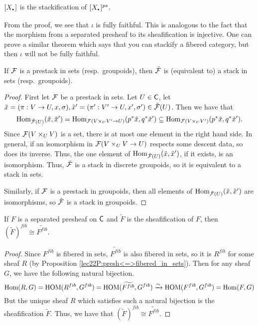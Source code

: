  \begin{definition}
   $[X_\udot]$ is the stackification of $[X_\udot]^{ps}$.
 \end{definition}
 \begin{remark}
   From the proof, we see that $\iota$ is fully faithful. This is analogous to the fact
   that the morphism from a separated presheaf to its sheafification is injective. One
   can prove a similar theorem which says that you can stackify a fibered category, but
   then $\iota$ will not be fully faithful. 
 \end{remark}
 \begin{lemma}
   If $\mathcal{F}$ is a prestack in sets (resp.~groupoids), then $\tilde {\mathcal{F}}$ is (equivalent to) a
   stack in sets (resp.~groupoids).
 \end{lemma}
 \begin{proof}
   First let $\mathcal{F}$ be a prestack in sets. Let $U\in \text{\sf C}$, let $\tilde x=(\pi:V\to
   U,x,\sigma),\tilde x'=(\pi':V'\to U,x',\sigma')\in \tilde{\mathcal{F}}(U)$. Then we have that
   \[
     \operatorname{Hom}_{\tilde {\mathcal{F}}(U)}(\tilde x,\tilde x') = \operatorname{Hom}_{\mathcal{F}(V\times_U V'\to U)}( p^*\tilde
     x,q^*\tilde x')\subseteq \operatorname{Hom}_{\mathcal{F}(V\times_U V')}( p^*\tilde x,q^*\tilde x').
   \]
   Since $\mathcal{F}(V\times_U V)$ is a set, there is at most one element in the right hand side.
   In general, if an isomorphism in $\mathcal{F}(V\times_U V\to U)$ respects some descent data, so
   does its inverse. Thus, the one element of $\operatorname{Hom}_{\tilde {\mathcal{F}}(U)}(\tilde x,\tilde x')$,
   if it exists, is an isomorphism. Thus, $\tilde{\mathcal{F}}$ is a stack in discrete groupoids, so
   it is equivalent to a stack in sets.

   Similarly, if $\mathcal{F}$ is a prestack in groupoids, then all elements of $\operatorname{Hom}_{\tilde
   {\mathcal{F}}(U)}(\tilde x,\tilde x')$ are isomorphisms, so $\tilde {\mathcal{F}}$ is a stack in groupoids.
 \end{proof}
 \begin{corollary}\label{lec25C:stackification<=>sheafification}
   If $F$ is a separated presheaf on $\text{\sf C}$ and $\tilde F$ is the sheafification of $F$,
   then $(\tilde F)^{fib}\cong \widetilde{F^{fib}}$.
 \end{corollary}
 \begin{proof}
   Since $F^{fib}$ is fibered in sets, $\widetilde{F^{fib}}$ is also fibered in sets, so
   it is $R^{fib}$ for some sheaf $R$ (by Proposition
   \ref{lec22P:presh<=>fibered_in_sets}). Then for any sheaf $G$, we have the following
   natural bijection.
   \[
    \operatorname{Hom}(R,G)=\operatorname{HOM}(R^{fib},G^{fib})=\operatorname{HOM}(\widetilde{F^{fib}},G^{fib})\xrightarrow\sim
    \operatorname{HOM}(F^{fib},G^{fib})=\operatorname{Hom}(F,G)
   \]
   But the unique sheaf $R$ which satisfies such a natural bijection is the
   sheafification $\tilde F$. Thus, we have that $(\tilde F)^{fib}\cong
   \widetilde{F^{fib}}$.
 \end{proof}

